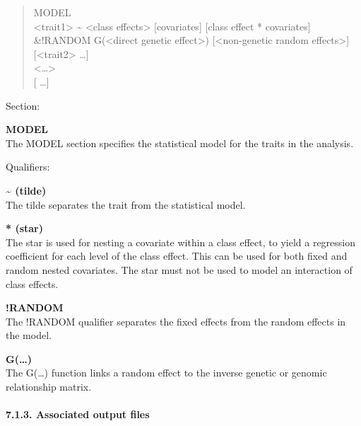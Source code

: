 \begin{quote}
MODEL\\
\textless trait1\textgreater{} \textasciitilde{} \textless class
effects\textgreater{} {[}covariates{]} {[}class effect * covariates{]}
\&!RANDOM G(\textless direct genetic effect\textgreater)
{[}\textless non-genetic random effects\textgreater{]}\\
{[}\textless trait2\textgreater{} \ldots{]}\\
\textless\ldots\textgreater{}\\
{[} \ldots{]}
\end{quote}

Section:

\textbf{MODEL}\\
The MODEL section specifies the statistical model for the traits in the
analysis.

Qualifiers:

\textbf{\textasciitilde{} (tilde)}\\
The tilde separates the trait from the statistical model.

\textbf{* (star)}\\
The star is used for nesting a covariate within a class effect, to yield
a regression coefficient for each level of the class effect. This can be
used for both fixed and random nested covariates. The star must not be
used to model an interaction of class effects.

\textbf{!RANDOM}\\
The !RANDOM qualifier separates the fixed effects from the random
effects in the model.

\textbf{G(\ldots)}\\
The G(\ldots) function links a random effect to the inverse genetic or
genomic relationship matrix.

\paragraph{7.1.3. Associated output files}\label{Stat05}

